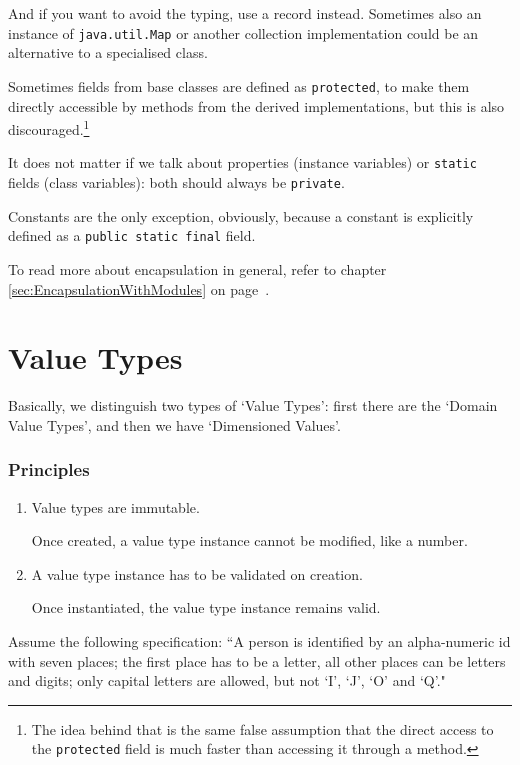 \documentclass[11pt,a4paper, titlepage, parskip=half, headsepline, footsepline, cleardoublepage=current, headheight=1cm]{scrbook}
\newcommand*{\tqvref}[1]{\hyperref[{#1}]{\ref*{#1}} on page~\pageref{#1}}
\begin{document}
And if you want to avoid the typing, use a record\autocite{ORACLE_DOC_RECORD,ORACLE_DOC_LANGUAGE_SPECIFICATION:RecordClasses,Eckel:JavaRecords}  instead. Sometimes also an instance of \lstinline|java.util.Map| or another collection implementation could be an alternative to a specialised class.
 
Sometimes fields from base classes are defined as \lstinline|protected|, to make them directly accessible by methods from the derived implementations, but this is also discouraged.\footnote{The idea behind that is the same false assumption that the direct access to the \lstinline|protected| field is much faster than accessing it through a method.}

It does not matter if we talk about properties (instance variables) or \lstinline|static| fields (class variables): both should always be \lstinline|private|.

Constants are the only exception, obviously, because a constant is explicitly defined as a \lstinline|public static final| field.

To read more about encapsulation in general, refer to chapter \tqvref{sec:EncapsulationWithModules}.


\section{Value Types}\label{sec:ValueTypes}
Basically, we distinguish two types of ‘Value Types’: first there are the ‘Domain Value Types’, and then we have ‘Dimensioned Values’.

\subsubsection{Principles}
\begin{enumerate}[label=P\arabic*.]
\item{Value types are immutable.

Once created, a value type instance cannot be modified, like a number.}

\item{A value type instance has to be validated on creation.

Once instantiated, the value type instance remains valid.}
\end{enumerate}

Assume the following specification: “A person is identified by an alpha-numeric id with seven places; the first place has to be a letter, all other places can be letters and digits; only capital letters are allowed, but not ‘I’, ‘J’, ‘O’ and ‘Q’."
\end{document}
